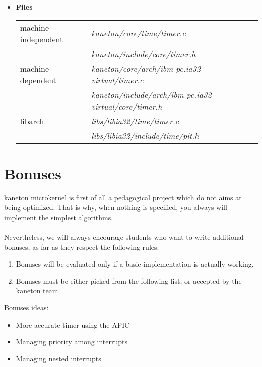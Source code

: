 \begin{itemize}
	 {
	   This function combines the effect of the two previous one.
	 }

	 {
	   This function returns in  the timer object
	   corresponding to .
	 }

	 {
	   This function initializes the timer manager.
	 }

	 {
	   This function cleans the timer manager.
	 }
  \item {\bf Files}\\

    \begin{tabular}{| l | l |}
      \hline
      machine-independent & {\em kaneton/core/time/timer.c}\\
      &  {\em kaneton/include/core/timer.h}\\\hline
      machine-dependent & {\em kaneton/core/arch/ibm-pc.ia32-virtual/timer.c}\\
      & {\em kaneton/include/arch/ibm-pc.ia32-virtual/core/timer.h}\\\hline
      libarch & {\em libs/libia32/time/timer.c}\\
      &  {\em libs/libia32/include/time/pit.h}\\\hline
    \end{tabular}

\end{itemize}

%
%

\newpage

\section{Bonuses}

kaneton microkernel is first of all a pedagogical project which do not
aims at being optimized. That is why, when nothing is specified, you
always will implement the simplest algorithms.\\
\\
Nevertheless, we will always encourage students who want to write
additional bonuses, as far as they respect the following rules:

\begin{enumerate}
  \item Bonuses will be evaluated only if a basic implementation is
  actually working.
  \item Bonuses must be either picked from the following list, or
  accepted by the kaneton team.\\
\end{enumerate}

Bonuses ideas:
\begin{itemize}
\item More accurate timer using the APIC
\item Managing priority among interrupts
\item Managing nested interrupts
\end{itemize}
